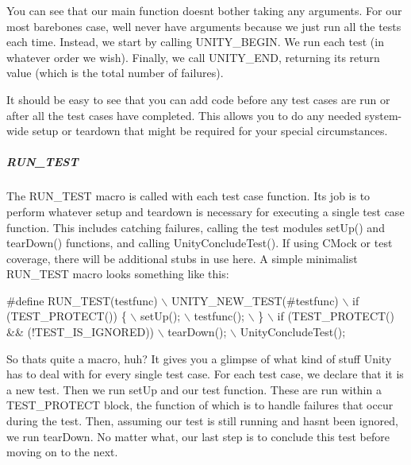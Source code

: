 You can see that our main function doesn\textquotesingle{}t bother taking any arguments. For our most barebones case, we\textquotesingle{}ll never have arguments because we just run all the tests each time. Instead, we start by calling {\ttfamily U\+N\+I\+T\+Y\+\_\+\+B\+E\+G\+IN}. We run each test (in whatever order we wish). Finally, we call {\ttfamily U\+N\+I\+T\+Y\+\_\+\+E\+ND}, returning its return value (which is the total number of failures).

It should be easy to see that you can add code before any test cases are run or after all the test cases have completed. This allows you to do any needed system-\/wide setup or teardown that might be required for your special circumstances.

\subparagraph*{{\ttfamily R\+U\+N\+\_\+\+T\+E\+ST}}

The {\ttfamily R\+U\+N\+\_\+\+T\+E\+ST} macro is called with each test case function. Its job is to perform whatever setup and teardown is necessary for executing a single test case function. This includes catching failures, calling the test module\textquotesingle{}s {\ttfamily set\+Up()} and {\ttfamily tear\+Down()} functions, and calling {\ttfamily Unity\+Conclude\+Test()}. If using C\+Mock or test coverage, there will be additional stubs in use here. A simple minimalist R\+U\+N\+\_\+\+T\+E\+ST macro looks something like this\+:


\begin{DoxyCode}
\textcolor{preprocessor}{#define RUN\_TEST(testfunc) \(\backslash\)}
\textcolor{preprocessor}{    UNITY\_NEW\_TEST(#testfunc) \(\backslash\)}
\textcolor{preprocessor}{    if (TEST\_PROTECT()) \{ \(\backslash\)}
\textcolor{preprocessor}{        setUp(); \(\backslash\)}
\textcolor{preprocessor}{        testfunc(); \(\backslash\)}
\textcolor{preprocessor}{    \} \(\backslash\)}
\textcolor{preprocessor}{    if (TEST\_PROTECT() && (!TEST\_IS\_IGNORED)) \(\backslash\)}
\textcolor{preprocessor}{        tearDown(); \(\backslash\)}
\textcolor{preprocessor}{    UnityConcludeTest();}
\end{DoxyCode}


So that\textquotesingle{}s quite a macro, huh? It gives you a glimpse of what kind of stuff Unity has to deal with for every single test case. For each test case, we declare that it is a new test. Then we run {\ttfamily set\+Up} and our test function. These are run within a {\ttfamily T\+E\+S\+T\+\_\+\+P\+R\+O\+T\+E\+CT} block, the function of which is to handle failures that occur during the test. Then, assuming our test is still running and hasn\textquotesingle{}t been ignored, we run {\ttfamily tear\+Down}. No matter what, our last step is to conclude this test before moving on to the next.

